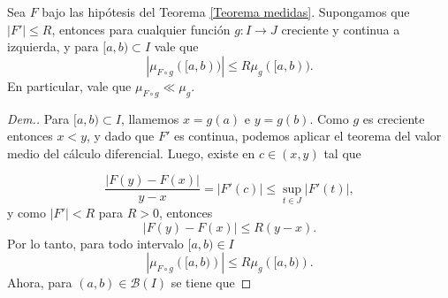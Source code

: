 \begin{lem}
Sea $F$ bajo las hipótesis del Teorema \ref{Teorema medidas}. Supongamos que $|F'|\leq R$, entonces para cualquier función $g:I\to J$ creciente y continua a izquierda, y para $[a,b)\subset I$  vale que \begin{equation}
    |\mu_{F\circ g}([a,b))|\leq R\mu_{g}([a,b)).
\end{equation}
En particular, vale que $\mu_{F\circ g}\ll \mu_g$.\label{lem: abs cont}
\end{lem}
\begin{proof}[Dem.]

Para $[a,b)\subset I$, llamemos $x=g(a)$ e $y=g(b)$. Como $g$ es creciente entonces $x<y$, y dado que $F'$ es continua, podemos aplicar el  teorema del valor medio del cálculo diferencial. Luego, existe en $c\in (x,y)$ tal que 

	$$ \dfrac{|F(y)-F(x)|}{y-x} =  |F'(c)| \leq \sup_{t\in J}\left|F'(t) \right|, $$
	y como $|F'|<R$ para $R>0$, entonces
	\begin{equation} \label{eq:f'}
		 |F(y)-F(x)| \leq R (y-x).
	\end{equation}
Por lo tanto, para todo intervalo $[a,b)\in I$
	\begin{equation*}
		|\mu_{F\circ g}\left( [a,b)\right)|\leq R\mu_{g}\left( [a,b)\right).
		\label{eq:medidas}
	\end{equation*}
Ahora, para $(a,b)\in \mathcal{B}(I)$ se tiene que
 


\end{proof}
